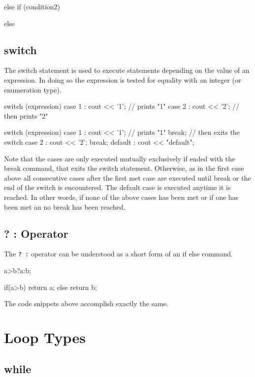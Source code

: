 \documentclass[10pt,a4paper]{scrartcl}
\begin{document}
\begin{multicols*}{2}
\begin{TPCpp}
{}
else if (condition2) {

}
else {

} 
\end{TPCpp}

\subsection{switch}
\label{sec:Switch}

The switch statement is used to execute statements depending on the value of an expression. In doing so the expression is tested for equality with an integer (or enumeration type).

\begin{TPCpp}
switch (expression) {
	case 1 : cout << '1'; // prints "1"
	case 2 : cout << '2'; // then prints "2"
}

switch (expression) {
	case 1 : cout << '1'; // prints "1"
		break;	// then exits the switch
	case 2 : cout << '2';
		break;
	default : cout << "default";
}
\end{TPCpp}

Note that the cases are only executed mutually exclusively if ended with the break command, that exits the switch statement. Otherwise, as in the first case above all consecutive cases after the first met case are executed until break or the end of the switch is encountered. The default case is executed anytime it is reached. In other words, if none of the above cases has been met or if one has been met an no break has been reached. 

\subsection{? : Operator}
\label{sec:QuestionmarkOperator}

The \verb+? :+ operator can be understood as a short form of an if else command.

\begin{TPCpp}
a>b?a:b;

if(a>b) {
	return a;
}
else {
	return b;
}
\end{TPCpp}

The code snippets above accomplish exactly the same.

\section{Loop Types}
\label{sec:LoopTypes}

\subsection{while}
\label{sec:While}


\end{multicols*}
\end{document}
